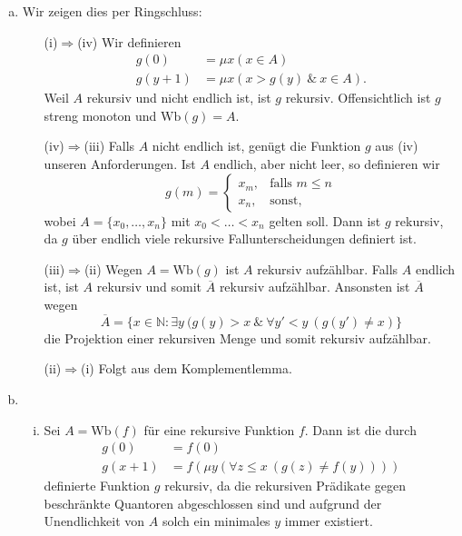 \documentclass[german,headsepline]{scrartcl}
\begin{document}
	\begin{solution}
		\begin{enumerate}[(a)]
			\item Wir zeigen dies per Ringschluss:
				\begin{enumerate}[\hspace{45pt}]
					\item[(i)$\Rightarrow$(iv)] Wir definieren
						\begin{align*}
							g(0) &= \mu x(x\in A) \\
							g(y+1) &= \mu x(x>g(y)~\&~x\in A).
						\end{align*}
						Weil $A$ rekursiv und nicht endlich ist, ist $g$ rekursiv.
						Offensichtlich ist $g$ streng monoton und $\text{Wb}(g)=A$.
					\item[(iv)$\Rightarrow$(iii)] Falls $A$ nicht endlich ist, genügt die Funktion $g$ aus (iv) unseren Anforderungen.
						Ist $A$ endlich, aber nicht leer, so definieren wir
						\[g(m)=\begin{cases}
							x_m, &\text{falls }m\leq n \\
							x_n, &\text{sonst,}
						\end{cases}\]
						wobei $A=\{x_0,\dots,x_n\}$ mit $x_0<\ldots<x_n$ gelten soll.
						Dann ist $g$ rekursiv, da $g$ über endlich viele rekursive Fallunterscheidungen definiert ist.
					\item[(iii)$\Rightarrow$(ii)] Wegen $A=\text{Wb}(g)$ ist $A$ rekursiv aufzählbar.
						Falls $A$ endlich ist, ist $A$ rekursiv und somit $\overline{A}$ rekursiv aufzählbar. Ansonsten ist $\overline{A}$ wegen
						\[\overline{A}=\{x\in\mathbb{N}\colon\exists y~(g(y)>x~\&~\forall y'<y~(g(y')\neq x)\}\]
						die Projektion einer rekursiven Menge und somit rekursiv aufzählbar.
					\item[(ii)$\Rightarrow$(i)] Folgt aus dem Komplementlemma.
				\end{enumerate}
			\item \begin{enumerate}[(i)]
					\item Sei $A=\text{Wb}(f)$ für eine rekursive Funktion $f$. Dann ist die durch
						\begin{align*}
							g(0) &= f(0) \\
							g(x+1) &= f(\mu y(\forall z\leq x~(g(z)\neq f(y))))
						\end{align*}
						definierte Funktion $g$ rekursiv, da die rekursiven Prädikate gegen beschränkte Quantoren abgeschlossen sind
						und aufgrund der Unendlichkeit von $A$ solch ein minimales $y$ immer existiert.

\end{enumerate}
\end{enumerate}
\end{solution}
\end{document}
